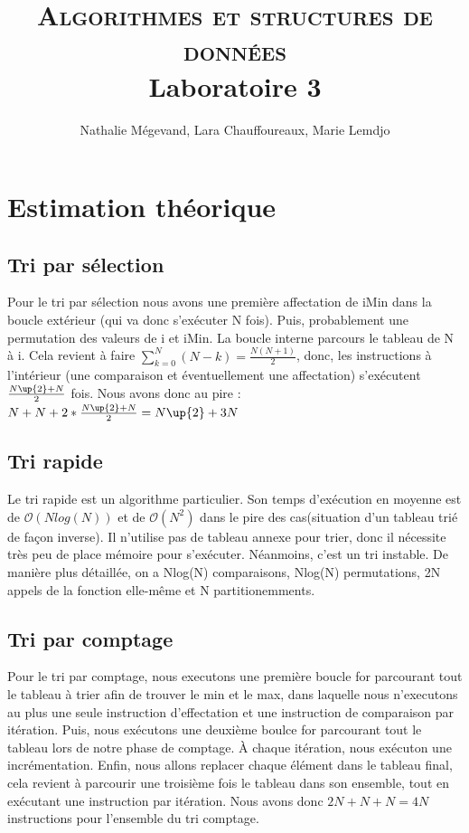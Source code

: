 \documentclass[11pt]{article}
\title{\vspace{-8mm}\textsc{\huge Algorithmes et structures de données}\\ 
 \large{ Laboratoire 3\\}
\vspace{-1 em}
}
\author{Nathalie Mégevand, Lara Chauffoureaux, Marie Lemdjo}
\begin{document}
\maketitle
\thispagestyle{fancy}



\section*{Estimation théorique}

\subsection*{Tri par sélection}
Pour le tri par sélection nous avons une première affectation de iMin dans la boucle extérieur (qui va donc s'exécuter N fois). Puis, probablement une permutation des valeurs de i et iMin.
La boucle interne parcours le tableau de N à i. Cela revient à faire $ \sum^{N}_{k = 0}{(N-k)} = \frac{N(N+1)}{2} $, donc, les instructions à l'intérieur (une comparaison et éventuellement une affectation) s'exécutent $ \frac{N\up{2} + N}{2} $ fois. Nous avons donc au pire : $ N + N + 2*\frac{N\up{2} + N}{2} = N\up{2} + 3N $

\subsection*{Tri rapide}

Le tri rapide est un algorithme particulier. Son temps d'exécution en moyenne est de $\mathcal{O}(Nlog(N))$ et de $\mathcal{O}(N^2)$ dans le pire des cas(situation d'un tableau trié de façon  inverse). Il n'utilise pas de tableau annexe pour trier, donc il nécessite très peu de place mémoire pour s'exécuter. Néanmoins, c'est un tri instable. De manière plus détaillée, on a Nlog(N) comparaisons, Nlog(N) permutations, 2N appels de la fonction elle-même et N partitionemments.


\subsection*{Tri par comptage}

Pour le tri par comptage, nous executons une première boucle for parcourant tout le tableau à trier afin de trouver le min et le max, dans laquelle nous n'executons au plus une seule instruction d'effectation et une instruction de comparaison par itération. Puis, nous exécutons une deuxième boulce for parcourant tout le tableau lors de notre phase de comptage. À chaque itération, nous exécuton une incrémentation. Enfin, nous allons replacer chaque élément dans le tableau final, cela revient à parcourir une troisième fois le tableau dans son ensemble, tout en exécutant une instruction par itération. Nous avons donc $2N + N + N = 4N$ instructions pour l'ensemble du tri comptage.
\end{document}

